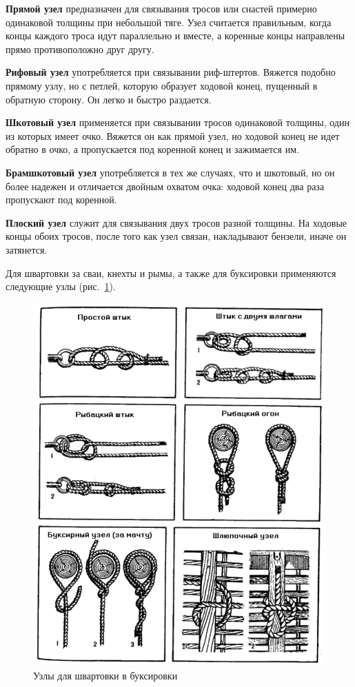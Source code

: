 \documentclass[a4paper, 12pt, twoside, final]{scrbook}
\begin{document}
\textbf{Прямой узел} предназначен для связывания тросов или снастей примерно одинаковой толщины при небольшой тяге. Узел считается правильным, когда концы каждого троса идут параллельно и вместе, а коренные концы направлены прямо противоположно друг другу.

\textbf{Рифовый узел} употребляется при связывании риф-штертов. Вяжется подобно прямому узлу, но с петлей, которую образует ходовой конец, пущенный в обратную сторону. Он легко и быстро раздается.

\textbf{Шкотовый узел} применяется при связывании тросов одинаковой толщины, один из которых имеет очко. Вяжется он как прямой узел, но ходовой конец не идет обратно в очко, а пропускается под коренной конец и зажимается им.

\textbf{Брамшкотовый узел} употребляется в тех же случаях, что и шкотовый, но он более надежен и отличается двойным охватом очка: ходовой конец два раза пропускают под коренной.

\textbf{Плоский узел} служит для связывания двух тросов разной толщины. На ходовые концы обоих тросов, после того как узел связан, накладывают бензели, иначе он затянется. 

Для швартовки за сваи, кнехты и рымы, а также для буксировки применяются следующие узлы (рис.~\ref{fig:60}).

\begin{figure}[htbp]
   \centering
   \includegraphics{pics/60_Uzly} %
   \caption{Узлы для швартовки в буксировки}
   \label{fig:60}
\end{figure}
\end{document}

